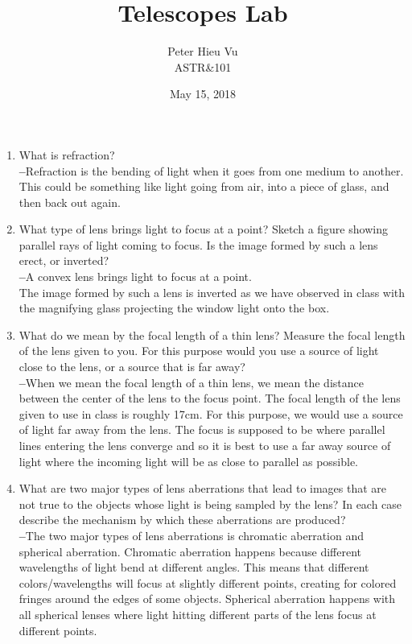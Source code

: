 \documentclass[12pt]{article}
\title{\vspace{-1.5cm}Telescopes Lab}
\author{Peter Hieu Vu\\ASTR\&101}
\date{May 15, 2018}
\newcommand\mk{\textbf{--}}
\begin{document}
    \maketitle

    \begin{enumerate}
        \item What is refraction?\\
            \mk{}Refraction is the bending of light when it goes from one medium to another. This could be something like light going from air, into a piece of glass, and then back out again.
        \item What type of lens brings light to focus at a point? Sketch a figure showing parallel rays of light coming to focus. Is the image formed by such a lens erect, or inverted?\\
            \mk{}A convex lens brings light to focus at a point. \vspace{5cm}\\
            The image formed by such a lens is inverted as we have observed in class with the magnifying glass projecting the window light onto the box.
        \item What do we mean by the focal length of a thin lens? Measure the focal length of the lens given to you. For this purpose would you use a source of light close to the lens, or a source that is far away?\\
            \mk{}When we mean the focal length of a thin lens, we mean the distance between the center of the lens to the focus point. The focal length of the lens given to use in class is roughly 17cm. For this purpose, we would use a source of light far away from the lens. The focus is supposed to be where parallel lines entering the lens converge and so it is best to use a far away source of light where the incoming light will be as close to parallel as possible.
        \item What are two major types of lens aberrations that lead to images that are not true to the objects whose light is being sampled by the lens? In each case describe the mechanism by which these aberrations are produced?\\
            \mk{}The two major types of lens aberrations is chromatic aberration and spherical aberration. Chromatic aberration happens because different wavelengths of light bend at different angles. This means that different colors/wavelengths will focus at slightly different points, creating for colored fringes around the edges of some objects. Spherical aberration happens with all spherical lenses where light hitting different parts of the lens focus at different points.

\end{enumerate}
\end{document}
